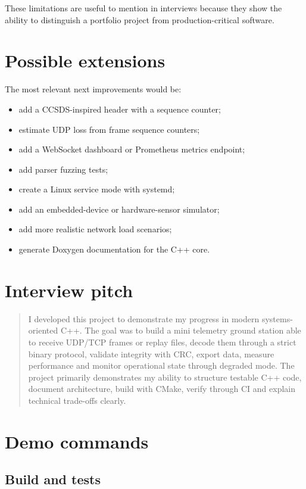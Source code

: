 \documentclass[11pt,a4paper]{article}
\begin{document}
These limitations are useful to mention in interviews because they show the ability to distinguish a portfolio project from production-critical software.

\section{Possible extensions}

The most relevant next improvements would be:

\begin{itemize}[nosep]
    \item add a CCSDS-inspired header with a sequence counter;
    \item estimate UDP loss from frame sequence counters;
    \item add a WebSocket dashboard or Prometheus metrics endpoint;
    \item add parser fuzzing tests;
    \item create a Linux service mode with systemd;
    \item add an embedded-device or hardware-sensor simulator;
    \item add more realistic network load scenarios;
    \item generate Doxygen documentation for the C++ core.
\end{itemize}

\section{Interview pitch}

\begin{quote}
I developed this project to demonstrate my progress in modern systems-oriented C++. The goal was to build a mini telemetry ground station able to receive UDP/TCP frames or replay files, decode them through a strict binary protocol, validate integrity with CRC, export data, measure performance and monitor operational state through degraded mode. The project primarily demonstrates my ability to structure testable C++ code, document architecture, build with CMake, verify through CI and explain technical trade-offs clearly.
\end{quote}

\section{Demo commands}

\subsection{Build and tests}
\end{document}
